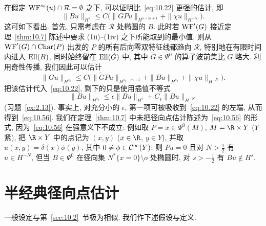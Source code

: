 \begin{remark}[无 $Gu$ 项]\label{rem:10.15}
在假定 $\operatorname{WF}^{s_0}(u) \cap \mathcal{R} = \emptyset$ 之下, 可以证明比~\eqref{eq:10.22} 更强的估计, 即
\begin{equation}\label{eq:10.56}
    \|B u\|_{H^s} \le C\bigl(\|G P u\|_{H^{s-m+1}} + \|\chi u\|_{H^{-N}}\bigr).
\end{equation}
这可如下看出. 首先, 只需考虑在 $\mathcal{R}$ 处椭圆的 $B$. 此时若 $\operatorname{WF}'(G)$ 接近定理~\ref{thm:10.7} 陈述中要求 (1ii)--(1iv) 之下所能取到的最小值, 则从 $\operatorname{WF}'(G) \cap \operatorname{Char}(P)$ 出发的 $P$ 的所有后向零双特征线都趋向 $\mathcal{R}$, 特别地在有限时间内进入 $\operatorname{Ell}(B)$, 同时始终留在 $\operatorname{Ell}(\tilde{G})$ 中, 其中 $\tilde{G} \in \Psi^0$ 的算子波前集比 $G$ 略大. 利用奇性传播, 我们因此可以估计
\begin{equation}\label{eq:10.57}
    \|G u\|_{H^{s_0}} \le C\bigl(\|\tilde{G} P u\|_{H^{s_0-m+1}} + \|B u\|_{H^{s_0}} + \|\chi u\|_{H^{-N}}\bigr).
\end{equation}
把该估计代入~\eqref{eq:10.22}, 剩下的只是使用插值不等式
\begin{equation}\label{eq:10.58}
    \|B u\|_{H^{s_0}} \le \epsilon\|B u\|_{H^s} + C_\epsilon \|B u\|_{H^{-N}}
\end{equation}
(习题~\ref{ex:2.13}). 事实上, 对充分小的 $\epsilon$, 第一项可被吸收到~\eqref{eq:10.22} 的左端, 从而得到~\eqref{eq:10.56}. 我们在定理~\ref{thm:10.7} 中未把径向点估计陈述为~\eqref{eq:10.56} 的形式, 因为~\eqref{eq:10.56} 在强意义下不成立: 例如取 $P = x \in \Psi^0(M)$, $M = \R \times Y$ ($Y$ 紧), 把 $\R \times Y$ 中的点记为 $(x, y)$ ($x \in \R$, $y \in Y$), 并取 $u(x, y) = \delta(x)\phi(y)$, 其中 $0 \neq \phi \in \mathcal{C}^\infty(Y)$; 则 $P u = 0$ 且对 $N > \frac{1}{2}$ 有 $u \in H^{-N}$, 但当 $B \in \Psi^0$ 在径向集 $N^*\{x = 0\} \setminus o$ 处椭圆时, 对 $s > -\frac{1}{2}$ 有 $B u \notin H^s$.
\end{remark}


\section{半经典径向点估计}\label{sec:10.3}
%

一般设定与第~\ref{sec:10.2}~节极为相似. 我们作下述假设与定义.

